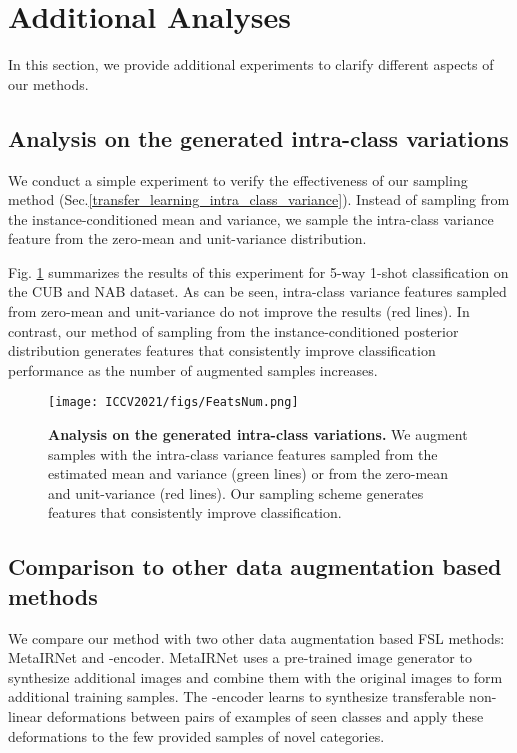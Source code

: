 \documentclass[10pt,twocolumn,letterpaper]{article}
\begin{document}
 \section{Additional Analyses}
 In this section, we provide additional experiments to clarify different aspects of our methods. 
  \subsection{Analysis on the generated intra-class variations}
  \label{sec:generated Intra-class Variance}
  
    
   
We conduct a simple experiment to verify the effectiveness of our sampling method (Sec.\ref{transfer_learning_intra_class_variance}). Instead of sampling from the instance-conditioned mean and variance, we sample the intra-class variance feature from the zero-mean and unit-variance distribution.  
   
   Fig. \ref{fig:feats_num} summarizes the results of this experiment for 5-way 1-shot classification on the CUB and NAB dataset. As can be seen, intra-class variance features sampled from zero-mean and unit-variance do not improve the results (red lines). In contrast, our method of sampling from the instance-conditioned posterior distribution generates features that consistently improve  classification performance as the number of augmented samples increases. 

   


  
   


  \begin{figure}[!htb]
  \centering
  \texttt{[image: ICCV2021/figs/FeatsNum.png]}
  \caption{
  \textbf{Analysis on the generated intra-class variations.}  We augment samples with the intra-class variance features sampled from the estimated mean and variance (green lines) or from the zero-mean and unit-variance (red lines). Our sampling scheme generates features that consistently improve  classification. 
}\label{fig:feats_num}
\end{figure}



\subsection{Comparison to other data augmentation based methods}
  
  We  compare our method with two other data augmentation based FSL methods: MetaIRNet\cite{metair_gan} and -encoder\cite{delta-encoder}.
MetaIRNet uses a pre-trained image generator to synthesize additional images and combine them with the original images to form additional training samples. The -encoder learns to synthesize transferable non-linear deformations between pairs of examples of seen classes 
  and apply these deformations to the few provided samples of novel categories.
\end{document}
